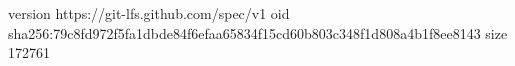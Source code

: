 version https://git-lfs.github.com/spec/v1
oid sha256:79c8fd972f5fa1dbde84f6efaa65834f15cd60b803c348f1d808a4b1f8ee8143
size 172761
